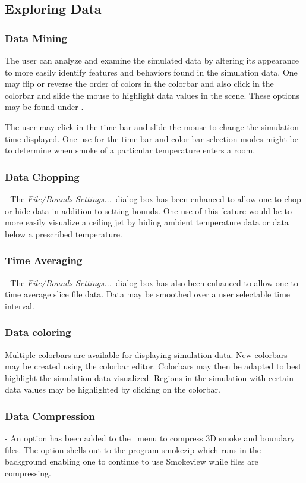 \documentclass[11pt,twoside]{book}
\newcommand{\frameit}[1]{\fbox{\tt #1}}
\begin{document}
\subsection{Exploring Data}

\subsubsection{Data Mining} The user can analyze and examine the simulated
data by altering its appearance to more easily identify features
and behaviors found in the simulation data. One may flip or
reverse the order of colors in the colorbar and also click in the
colorbar and slide the mouse to highlight data values in the
scene. These options may be found under \frameit{Options/Shades}.

The user may click in the time bar and slide the mouse to
change the simulation time displayed. One use for the time
bar and color bar selection modes might be to determine
when smoke of a particular temperature enters a room.

\subsubsection{Data Chopping} - The {\em File/Bounds Settings...}\
dialog box has been enhanced to allow one to chop or hide data in
addition to setting bounds. One use of this feature would be to
more easily visualize a ceiling jet by hiding ambient temperature
data or data below a prescribed temperature.

\subsubsection{Time Averaging} - The {\em File/Bounds Settings...}\
dialog box has also been enhanced to allow one to time average
slice file data.  Data may be smoothed over a user selectable time
interval.

\subsubsection{Data coloring} Multiple colorbars are available for displaying simulation data.
New colorbars may be created using the colorbar editor.  Colorbars may then be adapted to best highlight the simulation data visualized.
Regions in the simulation with certain data values may be highlighted by clicking on the colorbar.

\subsubsection{Data Compression} - An option has been added to the
\ menu to compress 3D smoke and boundary
files. The option shells out to the program smokezip which runs in
the background enabling one to continue to use Smokeview while
files are compressing.
\end{document}
